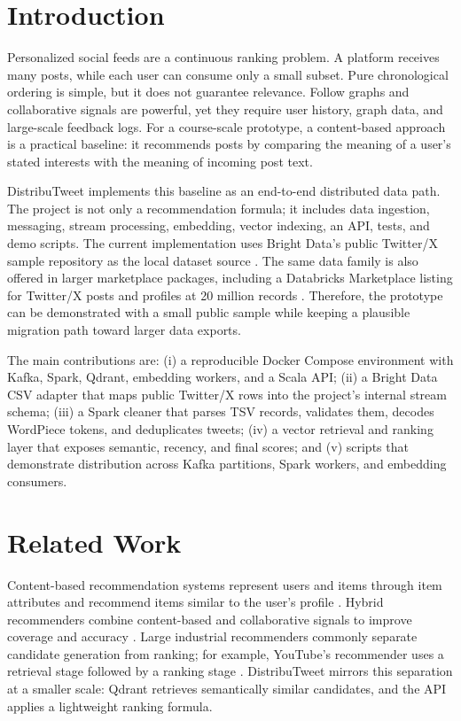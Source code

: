\documentclass[conference]{IEEEtran}
\begin{document}
\section{Introduction}
Personalized social feeds are a continuous ranking problem. A platform receives many posts, while each user can consume only a small subset. Pure chronological ordering is simple, but it does not guarantee relevance. Follow graphs and collaborative signals are powerful, yet they require user history, graph data, and large-scale feedback logs. For a course-scale prototype, a content-based approach is a practical baseline: it recommends posts by comparing the meaning of a user's stated interests with the meaning of incoming post text.

DistribuTweet implements this baseline as an end-to-end distributed data path. The project is not only a recommendation formula; it includes data ingestion, messaging, stream processing, embedding, vector indexing, an API, tests, and demo scripts. The current implementation uses Bright Data's public Twitter/X sample repository as the local dataset source \cite{brightdataGithub}. The same data family is also offered in larger marketplace packages, including a Databricks Marketplace listing for Twitter/X posts and profiles at 20 million records \cite{databricksBrightData}. Therefore, the prototype can be demonstrated with a small public sample while keeping a plausible migration path toward larger data exports.

The main contributions are: (i) a reproducible Docker Compose environment with Kafka, Spark, Qdrant, embedding workers, and a Scala API; (ii) a Bright Data CSV adapter that maps public Twitter/X rows into the project's internal stream schema; (iii) a Spark cleaner that parses TSV records, validates them, decodes WordPiece tokens, and deduplicates tweets; (iv) a vector retrieval and ranking layer that exposes semantic, recency, and final scores; and (v) scripts that demonstrate distribution across Kafka partitions, Spark workers, and embedding consumers.

\section{Related Work}
Content-based recommendation systems represent users and items through item attributes and recommend items similar to the user's profile \cite{pazzani2007content}. Hybrid recommenders combine content-based and collaborative signals to improve coverage and accuracy \cite{burke2002hybrid}. Large industrial recommenders commonly separate candidate generation from ranking; for example, YouTube's recommender uses a retrieval stage followed by a ranking stage \cite{covington2016youtube}. DistribuTweet mirrors this separation at a smaller scale: Qdrant retrieves semantically similar candidates, and the API applies a lightweight ranking formula.
\end{document}
